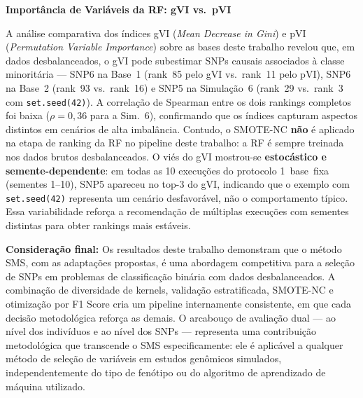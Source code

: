 \documentclass[
    12pt,
    a4paper,
    oneside,
    english,
    french,
    spanish,
    brazil
    ]{abntex2}
\newcommand{\novo}[1]{\textcolor{corNova}{#1}}
\begin{document}
\bigskip
\noindent\textbf{Importância de Variáveis da RF: gVI vs.\ pVI}

\novo{A análise comparativa dos índices gVI (\textit{Mean Decrease in Gini}) e pVI (\textit{Permutation Variable Importance}) sobre as bases deste trabalho revelou que, em dados desbalanceados, o gVI pode subestimar SNPs causais associados à classe minoritária --- SNP6 na Base~1 (rank~85 pelo gVI vs.\ rank~11 pelo pVI), SNP6 na Base~2 (rank~93 vs.\ rank~16) e SNP5 na Simulação~6 (rank~29 vs.\ rank~3 com \texttt{set.seed(42)}). A correlação de Spearman entre os dois rankings completos foi baixa ($\rho = 0{,}36$ para a Sim.~6), confirmando que os índices capturam aspectos distintos em cenários de alta imbalância. Contudo, o SMOTE-NC \textbf{não} é aplicado na etapa de ranking da RF no pipeline deste trabalho: a RF é sempre treinada nos dados brutos desbalanceados. O viés do gVI mostrou-se \textbf{estocástico e semente-dependente}: em todas as 10 execuções do protocolo 1~base~fixa (sementes 1--10), SNP5 apareceu no top-3 do gVI, indicando que o exemplo com \texttt{set.seed(42)} representa um cenário desfavorável, não o comportamento típico. Essa variabilidade reforça a recomendação de múltiplas execuções com sementes distintas para obter rankings mais estáveis.}

\bigskip
\noindent\textbf{Consideração final:} \novo{Os resultados deste trabalho demonstram que o método SMS, com as adaptações propostas, é uma abordagem competitiva para a seleção de SNPs em problemas de classificação binária com dados desbalanceados. A combinação de diversidade de kernels, validação estratificada, SMOTE-NC e otimização por F1 Score cria um pipeline internamente consistente, em que cada decisão metodológica reforça as demais. O arcabouço de avaliação dual --- ao nível dos indivíduos e ao nível dos SNPs --- representa uma contribuição metodológica que transcende o SMS especificamente: ele é aplicável a qualquer método de seleção de variáveis em estudos genômicos simulados, independentemente do tipo de fenótipo ou do algoritmo de aprendizado de máquina utilizado.}


\postextual

\renewcommand{\bibname}{\textbf{REFERÊNCIAS}}
\renewcommand{\refname}{\textbf{REFERÊNCIAS}}
\label{sec:referencias}


\end{document}
